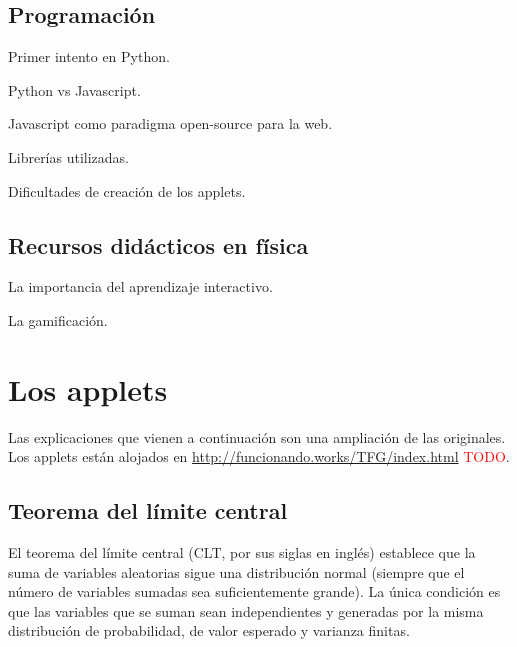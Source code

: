 \documentclass[11pt, a4paper]{article} %
\theoremstyle{named}
\begin{document}
\subsection{Programación}\label{sec:code}

Primer intento en Python.

Python vs Javascript.

Javascript como paradigma open-source para la web.

Librerías utilizadas.

Dificultades de creación de los applets.

\subsection{Recursos didácticos en física}

La importancia del aprendizaje interactivo.

La gamificación.

\section{Los applets}\label{sec:apps}


Las explicaciones que vienen a continuación son una ampliación de las originales. Los applets están alojados en \url{http://funcionando.works/TFG/index.html} \textcolor{red}{TODO}.

\newpage
\subsection{Teorema del límite central}\label{sec:central}

El teorema del límite central (CLT, por sus siglas en inglés) establece que la suma de variables aleatorias sigue una distribución normal (siempre que el número de variables sumadas sea suficientemente grande). La única condición es que las variables que se suman sean independientes y generadas por la misma distribución de probabilidad, de valor esperado y varianza finitas.
\end{document}
